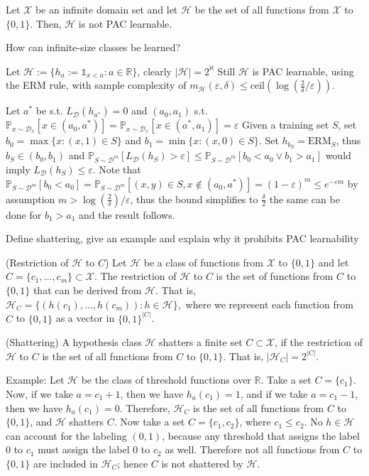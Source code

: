 \documentclass[11pt,a4paper,twoside]{article}
\begin{document}
Let \( \mathcal{X} \) be an infinite domain set and let \( \mathcal{H} \) be the set of all
functions from \( \mathcal{X} \) to \( \{0, 1\} \). Then, \( \mathcal{H} \) is not PAC learnable.


How can infinite-size classes be learned?

Let \( \mathcal{H} := \{ h_{a} := \mathbb{1}_{x < a} : a \in \mathbb{R} \} \), clearly \( |\mathcal{H}| = 2^\aleph \)
Still \( \mathcal{H} \) is PAC learnable, using the ERM rule, with sample complexity of \( m_{\mathcal{H}}(\varepsilon, \delta) \leq \text{ceil}(\log(\frac{2}{\delta}/\varepsilon)) \).

Let \( a^\ast \) be s.t. \( L_{\mathcal{D}}(h_{a^\ast}) = 0 \) and \( (a_0, a_1) \) s.t. 
\( \mathbb{P}_{x \sim \mathcal{D}_x}[x \in (a_0, a^\ast)] = \mathbb{P}_{x \sim \mathcal{D}_x}[x \in (a^\ast, a_1)] = \varepsilon \)
Given a training set \( S \), set \( b_0 = \max \{x : (x, 1) \in S\} \) and \( b_1 = \min\{x : (x, 0) \in S \}\).
Set \( h_{b_S} = \text{ERM}_S \), thus \( b_S \in (b_0, b_1) \) and 
\( \mathbb{P}_{S \sim \mathcal{D}^m}[L_{\mathcal{D}}(h_S) > \varepsilon] \leq \mathbb{P}_{S \sim \mathcal{D}^m}[b_0 < a_0 \vee b_1 > a_1] \)
would imply \( L_{\mathcal{D}}(h_{S}) \leq \varepsilon \). Note that
\( \mathbb{P}_{S \sim \mathcal{D}^m}[b_0 < a_0] = \mathbb{P}_{S \sim \mathcal{D}^m}[(x, y) \in S, x \nin (a_0, a^\ast)] = (1-\varepsilon)^m \leq e^{-\varepsilon m} \)
by assumption \( m > \log(\frac{2}{\delta})/\varepsilon  \), thus the bound simplifies to \( \frac{\delta}{2} \) the same can be done for \( b_1 > a_1 \) and the result follows.


Define shattering, give an example and explain why it prohibits PAC learnability

(Restriction of \(\mathcal{H}\) to \(C\)) 
Let \(\mathcal{H}\) be a class of functions from \(\mathcal{X}\) to \(\{0,1\}\) and let \(C = \{c_1, \ldots, c_m\} \subset \mathcal{X}\). 
The restriction of \(\mathcal{H}\) to \(C\) is the set of functions from \(C\) to \(\{0,1\}\) that can be derived from \(\mathcal{H}\). That is,
\(
\mathcal{H}_C = \{(h(c_1), \ldots, h(c_m)) : h \in \mathcal{H}\},
\)
where we represent each function from \(C\) to \(\{0,1\}\) as a vector in \(\{0, 1\}^{|C|}\).

(Shattering) A hypothesis class \(\mathcal{H}\) shatters a finite set \(C \subset \mathcal{X}\), 
if the restriction of \(\mathcal{H}\) to \(C\) is the set of all functions from \(C\) to \(\{0,1\}\). 
That is, \(|\mathcal{H}_C| = 2^{|C|}\).

Example:
Let \(\mathcal{H}\) be the class of threshold functions over \(\mathbb{R}\). Take a set \(C = \{c_1\}\). 
Now, if we take \(a = c_1 + 1\), then we have \(h_a(c_1) = 1\), and if we take \(a = c_1 - 1\), then we have \(h_a(c_1) = 0\). 
Therefore, \(\mathcal{H}_C\) is the set of all functions from \(C\) to \(\{0,1\}\), and \(\mathcal{H}\) shatters \(C\). 
Now take a set \(C = \{c_1, c_2\}\), where \(c_1 \leq c_2\). 
No \(h \in \mathcal{H}\) can account for the labeling \((0,1)\), because any threshold that assigns the label \(0\) to \(c_1\) 
must assign the label \(0\) to \(c_2\) as well. 
Therefore not all functions from \(C\) to \(\{0,1\}\) are included in \(\mathcal{H}_C\); hence \(C\) is not shattered by \(\mathcal{H}\).
\end{document}
